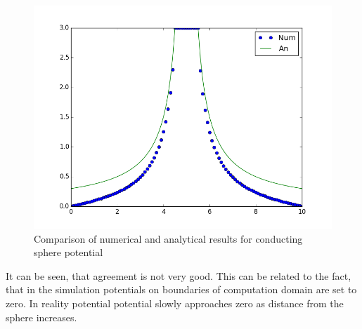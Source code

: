 \begin{figure}[H]
  \centering
  \includegraphics[scale=0.5]{./figs/ex4_conducting_sphere_potential/potential_along_z.png}
  \caption{Comparison of numerical and analytical results for
    conducting sphere potential}
\end{figure}

It can be seen, that agreement is not very good. This can be related
to the fact, that in the simulation potentials on boundaries of
computation domain are set to zero. In reality potential potential
slowly approaches zero as distance from the sphere increases.

